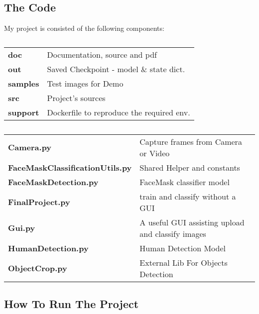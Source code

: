 \subsection{The Code}
My project is consisted of the following components:

\begin{table}[H]
    \centering
    \begin{tabular}{ll}
        \midrule
        \textbf{doc} & Documentation, source and pdf  \\
        \textbf{out} & Saved Checkpoint - model \& state dict. \\
        \textbf{samples} & Test images for Demo \\
        \textbf{src} & Project's sources \\
        \textbf{support} & Dockerfile to reproduce the required env. \\
        \bottomrule
    \end{tabular}
    \caption{}
    \label{tab:}
\end{table}


\begin{table}[H]
    \centering
    \begin{tabular}{ll}
        \midrule
        \textbf{Camera.py} & Capture frames from Camera or Video  \\
        \textbf{FaceMaskClassificationUtils.py} & Shared Helper and constants  \\
        \textbf{FaceMaskDetection.py} & FaceMask classifier model   \\
        \textbf{FinalProject.py} & train and classify without a GUI \\
        \textbf{Gui.py} & A useful GUI assisting upload and classify images \\
        \textbf{HumanDetection.py} & Human Detection Model \\
        \textbf{ObjectCrop.py} & External Lib For Objects Detection \\
        \bottomrule
    \end{tabular}
    \caption{}
    \label{tab:2}
\end{table}

\subsection{How To Run The Project}

